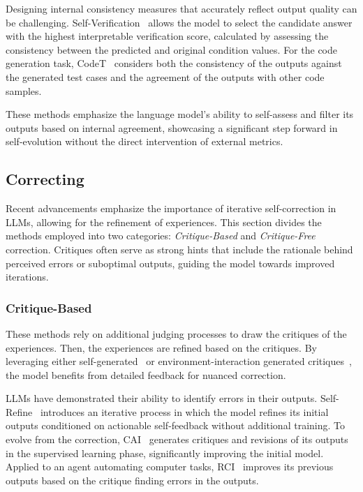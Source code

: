 \documentclass[sn-basic, Numbered]{sn-jnl}%
\theoremstyle{thmstyleone}%
\theoremstyle{thmstyletwo}%
\theoremstyle{thmstylethree}%
\begin{document}
Designing internal consistency measures that accurately reflect output quality can be challenging. Self-Verification~\cite{weng2023self} allows the model to select the candidate answer with the highest interpretable verification score, calculated by assessing the consistency between the predicted and original condition values. For the code generation task, CodeT~\cite{chen2022codet} considers both the consistency of the outputs against the generated test cases and the agreement of the outputs with other code samples. 

These methods emphasize the language model's ability to self-assess and filter its outputs based on internal agreement, showcasing a significant step forward in self-evolution without the direct intervention of external metrics.


\subsection{Correcting}
Recent advancements emphasize the importance of iterative self-correction in LLMs, allowing for the refinement of experiences.
This section divides the methods employed into two categories: \textit{Critique-Based} and \textit{Critique-Free} correction. Critiques often serve as strong hints that include the rationale behind perceived errors or suboptimal outputs, guiding the model towards improved iterations.

\subsubsection{Critique-Based}
These methods rely on additional judging processes to draw the critiques of the experiences. Then, the experiences are refined based on the critiques.
By leveraging either self-generated~\cite{mad2023refine, bai2022constitutional, shinn2023reflexion, lu2023self} or environment-interaction generated critiques~\cite{gou2023critic, jiang2023selfevolve, zhou2023isr}, the model benefits from detailed feedback for nuanced correction. 

LLMs have demonstrated their ability to identify errors in their outputs. Self-Refine~\cite{mad2023refine} introduces an iterative process in which the model refines its initial outputs conditioned on actionable self-feedback without additional training. To evolve from the correction, CAI~\cite{bai2022constitutional} generates critiques and revisions of its outputs in the supervised learning phase, significantly improving the initial model. Applied to an agent automating computer tasks, RCI~\cite{kim2023rci} improves its previous outputs based on the critique finding errors in the outputs. 
\end{document}
